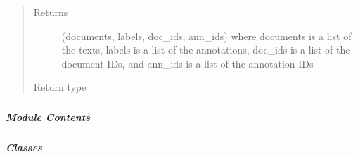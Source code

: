 \documentclass[letterpaper,10pt,english]{sphinxmanual}
\begin{document}
\begin{fulllineitems}
\begin{fulllineitems}
\begin{quote}
\begin{description}
\item[{Returns}] \leavevmode
\sphinxAtStartPar
(documents, labels, doc\_ids, ann\_ids) where documents is a list of the texts,
labels is a list of the annotations, doc\_ids is a list of the document IDs, and
ann\_ids is a list of the annotation IDs

\item[{Return type}] \leavevmode
\sphinxAtStartPar
{}

\end{description}\end{quote}

\end{fulllineitems}


\begin{fulllineitems}
\label{\detokenize{autoapi/pine/pipelines/EveClient/index:pine.pipelines.EveClient.EveClient.update}}
\end{fulllineitems}


\end{fulllineitems}



\subparagraph{}
\label{\detokenize{autoapi/pine/pipelines/NERWrapper/index:module-pine.pipelines.NERWrapper}}\label{\detokenize{autoapi/pine/pipelines/NERWrapper/index:pine-pipelines-nerwrapper}}\label{\detokenize{autoapi/pine/pipelines/NERWrapper/index::doc}}

\subparagraph{Module Contents}
\label{\detokenize{autoapi/pine/pipelines/NERWrapper/index:module-contents}}

\subparagraph{Classes}
\label{\detokenize{autoapi/pine/pipelines/NERWrapper/index:classes}}
\end{document}
